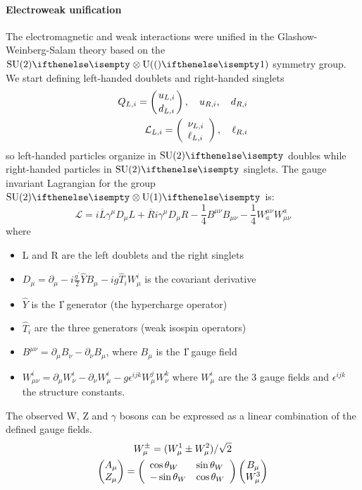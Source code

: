\paragraph*{Electroweak unification}\label{sub:EW}
The electromagnetic and weak interactions were unified in the Glashow-Weinberg-Salam theory \ADDREF based on the $\SU{2} \otimes \U(1)$ symmetry group.\\
We start defining left-handed doublets and right-handed singlets
\begin{align}
    Q_{L,i}=\left({u_{L,i}}\atop{d_{L,i}}\right), \quad u_{R,i},\quad d_{R,i} \\
    \mathcal{L}_{L,i}=\left(\begin{array}{l}{{\nu_{L,i}}}\\ {{\ell_{L,i}}}\end{array}\right),\quad\ell_{R,i}
\end{align}
so left-handed particles organize in $\SU{2}$ doubles while right-handed particles in $\SU{2}$ singlets.
The gauge invariant Lagrangian for the group $\SU{2}\otimes\U{1}$ is:
\begin{equation}\label{eq:EWK_preunification}
{\mathcal{L}}=i\overline{{{L}}}\gamma^{\mu}D_{\mu}L+\overline{{{R}}}i\gamma^{\mu}D_{\mu}R-\frac{1}{4}B^{\mu\nu}B_{\mu\nu}-\frac{1}{4}W_{a}^{\mu\nu}W_{\mu\nu}^{a}
\end{equation}
where
\begin{itemize}
    \item L and R are the left doublets and the right singlets
    \item $D_{\mu}=\partial_{\mu}-i{\frac{g^{\prime}}{2}}\hat{Y}B_{\mu}-i g\hat{T}_{i}W_{\mu}^{i}$ is the covariant derivative
    \item $\hat{Y}$ is the \U{1} generator (the hypercharge operator)
    \item $\hat{T}_i$ are the three  generators (weak isospin operators)
    \item $B^{\mu\nu}=\partial_{\mu}B_{\nu}-\partial_{\nu}B_{\mu}$, where $B_\mu$ is the \U{1} gauge field
    \item $W_{\mu\nu}^{i}=\partial_{\mu}W_{\nu}^{i}-\partial_{\nu}W_{\mu}^{i}-g\epsilon^{i j k}W_{\mu}^{j}W_{\nu}^{k}$ where $W^i_\mu$ are the 3  gauge fields and $\epsilon^{ijk}$ the  structure constants. 
\end{itemize}
The observed W, Z and $\gamma$ bosons can be expressed as a linear combination of the defined gauge fields.
\begin{gather}
    W_\mu^{\pm}=(W^1_\mu\pm W^2_\mu)/\sqrt{2}\\
    \db{A_\mu}{Z_\mu}=\left(\begin{array}{l l}{{\cos\theta_{W}}}&{{\sin\theta_{W}}}\\ {{-\sin\theta_{W}}}&{{\cos\theta_{W}}}\end{array}\right)\db{B_\mu}{W^3_\mu}
\end{gather}
